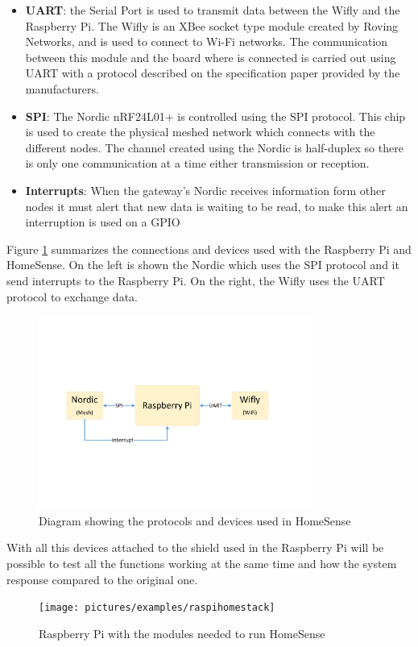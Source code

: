 \begin{itemize}
\item \textbf{UART}: the Serial Port is used to transmit data between the Wifly and the Raspberry Pi. The Wifly is an XBee socket type module created by Roving Networks, and is used to connect to Wi-Fi networks. The communication between this module and the board where is connected is carried out using UART with a protocol described on the specification paper provided by the manufacturers.

\item \textbf{SPI}: The Nordic nRF24L01+ is controlled using the SPI protocol. This chip is used to create the physical meshed network which connects with the different nodes. The channel created using the Nordic is half-duplex so there is only one communication at a time either transmission or reception.
\item \textbf{Interrupts}: When the gateway's Nordic receives information form other nodes it must alert that new data is waiting to be read, to make this alert an interruption is used on a GPIO
\end{itemize}
Figure \ref{fig:IOEx-GW-Diagram} summarizes the connections and devices used with the Raspberry Pi and HomeSense. On the left is shown the Nordic which uses the SPI protocol and it send interrupts to the Raspberry Pi. On the right, the Wifly uses the UART protocol to exchange data.
\begin{figure}[H]\begin{center}
 \centering
  \captionsetup{justification=centering}
  \includegraphics[width=0.8\textwidth]{pictures/examples/gateway-diagram}
  \caption{Diagram showing the protocols and devices used in HomeSense\label{fig:IOEx-GW-Diagram}}
\end{center}\end{figure}
With all this devices attached to the shield used in the Raspberry Pi will be possible to test all the functions working at the same time and how the system response compared to the original one.
\begin{figure}[H]\begin{center}
 \centering
  \captionsetup{justification=centering}
  \texttt{[image: pictures/examples/raspihomestack]}
  \caption{Raspberry Pi with the modules needed to run HomeSense\label{fig:IOEx-HS-Stack}}
\end{center}\end{figure}

